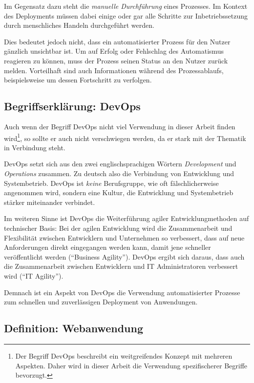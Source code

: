 Im Gegensatz dazu steht die \emph{manuelle Durchführung} eines Prozesses. Im Kontext des Deployments müssen dabei einige oder gar alle Schritte zur Inbetriebssetzung durch menschliches Handeln durchgeführt werden.

Dies bedeutet jedoch nicht, dass ein automatisierter Prozess für den Nutzer gänzlich unsichtbar ist. Um auf Erfolg oder Fehlschlag des Automatismus reagieren zu können, muss der Prozess seinen Status an den Nutzer zurück melden. Vorteilhaft sind auch Informationen während des Prozessablaufs, beispielsweise um dessen Fortschritt zu verfolgen. \citep[10f]{Duvall2007}

\subsection{Begriffserklärung: DevOps}

Auch wenn der Begriff DevOps nicht viel Verwendung in dieser Arbeit finden wird\footnote{Der Begriff DevOps beschreibt ein weitgreifendes Konzept mit mehreren Aspekten. Daher wird in dieser Arbeit die Verwendung spezifischerer Begriffe bevorzugt.}, so sollte er auch nicht verschwiegen werden, da er stark mit der Thematik in Verbindung steht.

DevOps setzt sich aus den zwei englischsprachigen Wörtern \emph{Development} und \emph{Operations} zusammen. Zu deutsch also die Verbindung von Entwicklung und Systembetrieb. DevOps ist \emph{keine} Berufsgruppe, wie oft fälschlicherweise angenommen wird, sondern eine Kultur, die Entwicklung und Systembetrieb stärker miteinander verbindet.

Im weiteren Sinne ist DevOps die Weiterführung agiler Entwicklungmethoden auf technischer Basis: Bei der agilen Entwicklung wird die Zusammenarbeit und Flexibilität zwischen Entwicklern und Unternehmen so verbessert, dass auf neue Anforderungen direkt eingegangen werden kann, damit jene schneller veröffentlicht werden (``Business Agility''). DevOps ergibt sich daraus, dass auch die Zusammenarbeit zwischen Entwicklern und IT Administratoren verbessert wird (``IT Agility''). \citep[4f]{Chapman2014}

Demnach ist ein Aspekt von DevOps die Verwendung automatisierter Prozesse zum schnellen und zuverlässigen Deployment von Anwendungen.

\subsection{Definition: Webanwendung}

